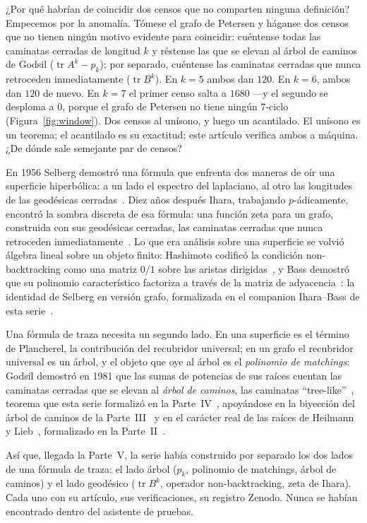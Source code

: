 \documentclass[11pt]{article}
\DeclareMathOperator{\tr}{tr}
\begin{document}
¿Por qué habrían de coincidir dos censos que no comparten ninguna definición? Empecemos por
la anomalía. Tómese el grafo de Petersen y háganse dos censos que no tienen ningún motivo
evidente para coincidir: cuéntense todas las caminatas cerradas de longitud
$k$ y réstense las que se elevan al árbol de caminos de Godsil ($\tr A^k - p_k$); por
separado, cuéntense las caminatas cerradas que nunca retroceden inmediatamente
($\tr B^k$). En $k = 5$ ambos dan $120$. En $k = 6$, ambos dan $120$ de nuevo. En $k = 7$
el primer censo salta a $1680$ ---y el segundo se desploma a $0$, porque el grafo de
Petersen no tiene ningún $7$-ciclo (Figura~\ref{fig:window}). Dos censos al unísono, y
luego un acantilado. El unísono es un teorema; el acantilado es su exactitud; este artículo
verifica ambos a máquina. ¿De dónde sale semejante par de censos?

En 1956 Selberg demostró una fórmula que enfrenta dos maneras de oír una superficie
hiperbólica: a un lado el espectro del laplaciano, al otro las longitudes de las geodésicas
cerradas~\cite{Selberg1956}. Diez años después Ihara, trabajando $p$-ádicamente, encontró la
sombra discreta de esa fórmula: una función zeta para un grafo, construida con sus
geodésicas cerradas, las caminatas cerradas que nunca retroceden
inmediatamente~\cite{Ihara1966}. Lo que era análisis sobre una superficie se volvió álgebra
lineal sobre un objeto finito: Hashimoto codificó la condición non-backtracking como una
matriz $0/1$ sobre las aristas dirigidas~\cite{Hashimoto1989}, y Bass demostró que su
polinomio característico factoriza a través de la matriz de adyacencia~\cite{Bass1992}: la
identidad de Selberg en versión grafo, formalizada en el companion Ihara--Bass de esta
serie~\cite{MarinBass2026}.

Una fórmula de traza necesita un segundo lado. En una superficie es el término de
Plancherel, la contribución del recubridor universal; en un grafo el recubridor universal es
un árbol, y el objeto que oye al árbol es el \emph{polinomio de matchings}: Godsil demostró
en 1981 que las sumas de potencias de sus raíces cuentan las caminatas cerradas que se
elevan al \emph{árbol de caminos}, las caminatas ``tree-like''~\cite{Godsil1981}, teorema
que esta serie formalizó en la Parte~IV~\cite{MarinMoment2026}, apoyándose en la biyección
del árbol de caminos de la Parte~III~\cite{MarinPTW2026} y en el carácter real de las raíces
de Heilmann y Lieb~\cite{HeilmannLieb1972}, formalizado en la Parte~II~\cite{MarinHL2026}.

Así que, llegada la Parte~V, la serie había construido por separado los dos lados de una
fórmula de traza: el lado árbol ($p_k$, polinomio de matchings, árbol de caminos) y el lado
geodésico ($\tr B^k$, operador non-backtracking, zeta de Ihara). Cada uno con su artículo,
sus verificaciones, su registro Zenodo. Nunca se habían encontrado dentro del asistente de
pruebas.
\end{document}
